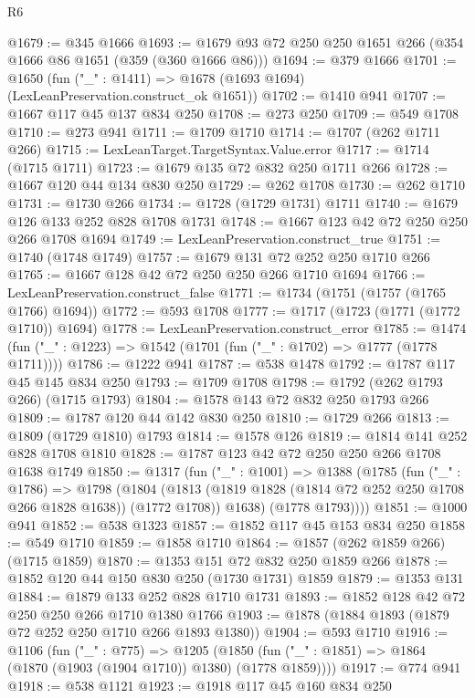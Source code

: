 \begin{lexlean}{R6}
\begin{coremodule}
@1679 := @345 @1666
@1693 := @1679 @93 @72 @250 @250 @1651 @266 (@354 @1666 @86 @1651 (@359 (@360 @1666 @86)))
@1694 := @379 @1666
@1701 := @1650 (fun ("_" : @1411) => @1678 (@1693 @1694) (LexLeanPreservation.construct_ok @1651))
@1702 := @1410 @941
@1707 := @1667 @117 @45 @137 @834 @250
@1708 := @273 @250
@1709 := @549 @1708
@1710 := @273 @941
@1711 := @1709 @1710
@1714 := @1707 (@262 @1711 @266)
@1715 := LexLeanTarget.TargetSyntax.Value.error
@1717 := @1714 (@1715 @1711)
@1723 := @1679 @135 @72 @832 @250 @1711 @266
@1728 := @1667 @120 @44 @134 @830 @250
@1729 := @262 @1708
@1730 := @262 @1710
@1731 := @1730 @266
@1734 := @1728 (@1729 @1731) @1711
@1740 := @1679 @126 @133 @252 @828 @1708 @1731
@1748 := @1667 @123 @42 @72 @250 @250 @266 @1708 @1694
@1749 := LexLeanPreservation.construct_true
@1751 := @1740 (@1748 @1749)
@1757 := @1679 @131 @72 @252 @250 @1710 @266
@1765 := @1667 @128 @42 @72 @250 @250 @266 @1710 @1694
@1766 := LexLeanPreservation.construct_false
@1771 := @1734 (@1751 (@1757 (@1765 @1766) @1694))
@1772 := @593 @1708
@1777 := @1717 (@1723 (@1771 (@1772 @1710)) @1694)
@1778 := LexLeanPreservation.construct_error
@1785 := @1474 (fun ("_" : @1223) => @1542 (@1701 (fun ("_" : @1702) => @1777 (@1778 @1711))))
@1786 := @1222 @941
@1787 := @538 @1478
@1792 := @1787 @117 @45 @145 @834 @250
@1793 := @1709 @1708
@1798 := @1792 (@262 @1793 @266) (@1715 @1793)
@1804 := @1578 @143 @72 @832 @250 @1793 @266
@1809 := @1787 @120 @44 @142 @830 @250
@1810 := @1729 @266
@1813 := @1809 (@1729 @1810) @1793
@1814 := @1578 @126
@1819 := @1814 @141 @252 @828 @1708 @1810
@1828 := @1787 @123 @42 @72 @250 @250 @266 @1708 @1638 @1749
@1850 := @1317
    (fun ("_" : @1001) =>
    @1388
      (@1785
        (fun ("_" : @1786) =>
        @1798
          (@1804
            (@1813 (@1819 @1828 (@1814 @72 @252 @250 @1708 @266 @1828 @1638)) (@1772 @1708))
            @1638)
          (@1778 @1793))))
@1851 := @1000 @941
@1852 := @538 @1323
@1857 := @1852 @117 @45 @153 @834 @250
@1858 := @549 @1710
@1859 := @1858 @1710
@1864 := @1857 (@262 @1859 @266) (@1715 @1859)
@1870 := @1353 @151 @72 @832 @250 @1859 @266
@1878 := @1852 @120 @44 @150 @830 @250 (@1730 @1731) @1859
@1879 := @1353 @131
@1884 := @1879 @133 @252 @828 @1710 @1731
@1893 := @1852 @128 @42 @72 @250 @250 @266 @1710 @1380 @1766
@1903 := @1878 (@1884 @1893 (@1879 @72 @252 @250 @1710 @266 @1893 @1380))
@1904 := @593 @1710
@1916 := @1106
    (fun ("_" : @775) =>
    @1205 (@1850 (fun ("_" : @1851) => @1864 (@1870 (@1903 (@1904 @1710)) @1380) (@1778 @1859))))
@1917 := @774 @941
@1918 := @538 @1121
@1923 := @1918 @117 @45 @160 @834 @250

\end{coremodule}
\end{lexlean}

